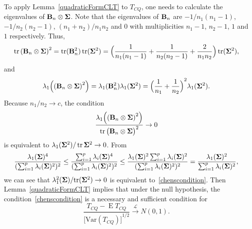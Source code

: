 \documentclass[3p]{elsarticle}
\DeclareMathOperator{\mytr}{tr}
\DeclareMathOperator{\myE}{E}
\theoremstyle{plain}
\theoremstyle{definition}
\theoremstyle{remark}
\begin{document}
To apply Lemma~\ref{quadraticFormCLT} to $T_{CQ}$, one needs to calculate the eigenvalues of $\mathbf{B}_n\otimes \boldsymbol{\Sigma}$.
    Note that the eigenvalues of $\mathbf{B}_n$ are $-1/n_1(n_1-1)$, $-1/n_2(n_2-1)$, $(n_1+n_2)/n_1 n_2$ and $0$ with multiplicities $n_1-1$, $n_2-1$, $1$ and $1$ respectively.
    Thus,
    \begin{equation*}
        \mytr{(\BB_n\otimes \bSigma)}^2=\mytr(\BB_n^2)\mytr(\bSigma^2)=\Big(\frac{1}{n_1(n_1-1)}+\frac{1}{n_2(n_2-1)}+\frac{2}{n_1 n_2}\Big)\mytr (\bSigma^2),
    \end{equation*}
and
    \begin{equation*}
        \lambda_{1}\Big({(\mathbf{B}_n\otimes \boldsymbol{\Sigma})}^2\Big)=\lambda_{1}(\mathbf{B}_n^2)\lambda_{1}(\boldsymbol{\Sigma}^2)={\Big(\frac{1}{n_1}+\frac{1}{n_2}\Big)}^2\lambda_{1}(\boldsymbol{\Sigma}^2).
    \end{equation*}
    Because $n_1/n_2\to c$, the condition
    $$
         \frac{\lambda_{1}\Big({(\BB_n\otimes \bSigma)}^2\Big)}{
\mytr{\big(\BB_n\otimes \bSigma\big)}^2}
         \to 0
    $$
     is equivalent to $\lambda_{1}(\bSigma^2)/\mytr\bSigma^2\to 0$.
From
$$
\frac{\lambda_1(\boldsymbol{\Sigma})^4}{(\sum_{i=1}^p \lambda_i(\boldsymbol{\Sigma})^2)^2}
\leq
\frac{\sum_{i=1}^p\lambda_i(\boldsymbol{\Sigma})^4}{(\sum_{i=1}^p \lambda_i(\boldsymbol{\Sigma})^2)^2}
\leq
\frac{\lambda_1(\boldsymbol{\Sigma})^2\sum_{i=1}^p\lambda_i(\boldsymbol{\Sigma})^2}{(\sum_{i=1}^p \lambda_i(\boldsymbol{\Sigma})^2)^2}
=
\frac{\lambda_1(\boldsymbol{\Sigma})^2}{\sum_{i=1}^p \lambda_i(\boldsymbol{\Sigma})^2},
$$
    we can see that ${\lambda_{1}^2(\boldsymbol{\Sigma})}/{\mathrm{tr}(\boldsymbol{\Sigma}^2)}\to 0$  is equivalent to~\eqref{chenscondition}.
Then Lemma~\ref{quadraticFormCLT} implies that under the null hypothesis, the condition~\eqref{chenscondition} is a necessary and sufficient condition for 
    \begin{equation*}
        \frac{T_{CQ}-\myE T_{CQ}}{{\big[\mathrm{Var}(T_{CQ})\big]}^{1/2}}\xrightarrow{\mathcal{L}}N(0,1).
    \end{equation*}
\end{document}
